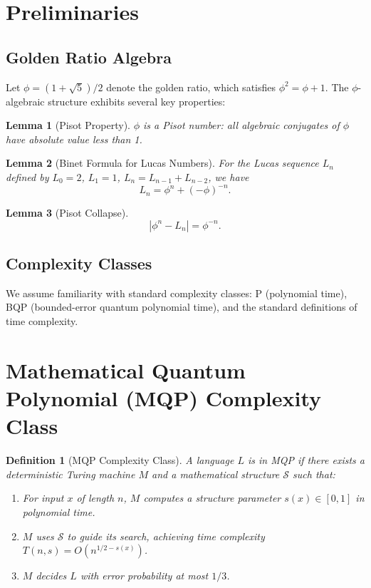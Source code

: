 \documentclass{article}
\newtheorem{lemma}{Lemma}
\newtheorem{definition}{Definition}
\theoremstyle{remark}
\begin{document}
\section{Preliminaries}

\subsection{Golden Ratio Algebra}

Let $\phi = (1 + \sqrt{5})/2$ denote the golden ratio, which satisfies $\phi^2 = \phi + 1$. The $\phi$-algebraic structure exhibits several key properties:

\begin{lemma}[Pisot Property]
$\phi$ is a Pisot number: all algebraic conjugates of $\phi$ have absolute value less than 1.
\end{lemma}

\begin{lemma}[Binet Formula for Lucas Numbers]
For the Lucas sequence $L_n$ defined by $L_0 = 2$, $L_1 = 1$, $L_n = L_{n-1} + L_{n-2}$, we have
\[
L_n = \phi^n + (-\phi)^{-n}.
\]
\end{lemma}

\begin{lemma}[Pisot Collapse]
\[
|\phi^n - L_n| = \phi^{-n}.
\]
\end{lemma}

\subsection{Complexity Classes}

We assume familiarity with standard complexity classes: P (polynomial time), BQP (bounded-error quantum polynomial time), and the standard definitions of time complexity.

\section{Mathematical Quantum Polynomial (MQP) Complexity Class}

\begin{definition}[MQP Complexity Class]
A language $L$ is in MQP if there exists a deterministic Turing machine $M$ and a mathematical structure $\mathcal{S}$ such that:
\begin{enumerate}
\item For input $x$ of length $n$, $M$ computes a structure parameter $s(x) \in [0,1]$ in polynomial time.
\item $M$ uses $\mathcal{S}$ to guide its search, achieving time complexity $T(n,s) = O(n^{1/2-s(x)})$.
\item $M$ decides $L$ with error probability at most $1/3$.
\end{enumerate}
\end{definition}
\end{document}
